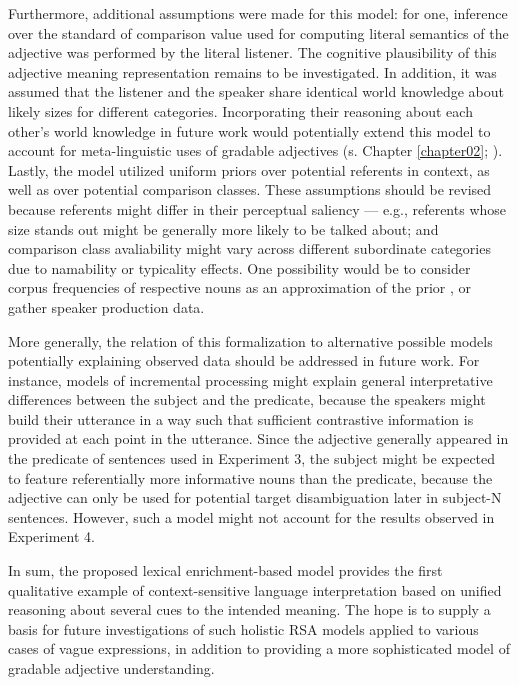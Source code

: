 Furthermore, additional assumptions were made for this model: for one, inference over the standard of comparison value used for computing literal semantics of the adjective was performed by the literal listener. The cognitive plausibility of this adjective meaning representation remains to be investigated. In addition, it was assumed that the listener and the speaker share identical world knowledge about likely sizes for different categories. Incorporating their reasoning about each other's world knowledge in future work would potentially extend this model to account for meta-linguistic uses of gradable adjectives (s. Chapter \ref{chapter02}; \textcite{barker2002dynamics}). Lastly, the model utilized uniform priors over potential referents in context, as well as over potential comparison classes. These assumptions should be revised because referents might differ in their perceptual saliency --- e.g., referents whose size stands out might be generally more likely to be talked about; and comparison class avaliability might vary across different subordinate categories due to namability or typicality effects. One possibility would be to consider corpus frequencies of respective nouns as an approximation of the prior \parencite[following the model by][]{tessler2017warm}, or gather speaker production data. 

More generally, the relation of this formalization to alternative possible models potentially explaining observed data should be addressed in future work. For instance, models of incremental processing might explain general interpretative differences between the subject and the predicate, because the speakers might build their utterance in a way such that sufficient contrastive information is provided at each point in the utterance. Since the adjective generally appeared in the predicate of sentences used in Experiment 3, the subject might be expected to feature referentially more informative nouns than the predicate, because the adjective can only be used for potential target disambiguation later  in subject-N sentences. However, such a model might not account for the results observed in Experiment 4.  

In sum, the proposed lexical enrichment-based model provides the first qualitative example of context-sensitive language interpretation based on unified reasoning about several cues to the intended meaning. The hope is to supply a basis for future investigations of such holistic RSA models applied to various cases of vague expressions, in addition to providing a more sophisticated model of gradable adjective understanding.

